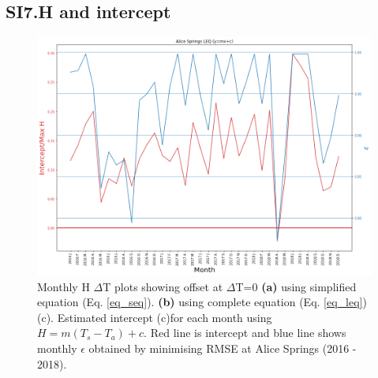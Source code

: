 \documentclass[fleqn,10pt]{wlscirep}
\begin{document}
\subsection*{SI7.H and intercept}
\label{Subsection:intercept}
\begin{figure}[h!]
  \includegraphics[scale=0.5]{Plots/as_mx+c.png}
  \caption{Monthly H $\Delta$T plots showing offset at $\Delta$T=0 \textbf{(a)} using simplified equation (Eq. \ref{eq_seq}). \textbf {(b)} using complete equation (Eq. \ref{eq_leq})(c). Estimated intercept (c)for each month using $H = m (T_{s} - T_{a})+ c$. Red line is intercept and blue line shows monthly $\epsilon$ obtained by minimising RMSE at Alice Springs (2016 - 2018).}
  \label{fig:yr_intrc}
  \end{figure}

\end{document}
